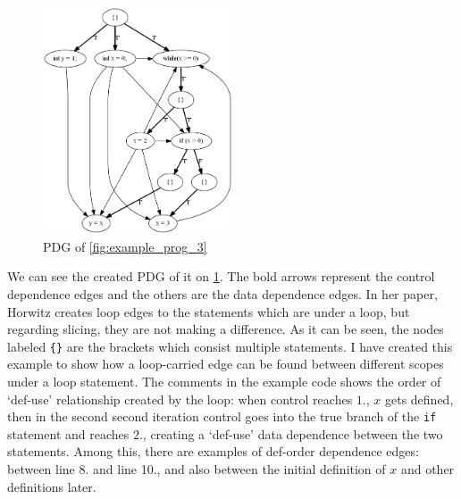 \documentclass[oneside,12pt,a4paper]{book}
\begin{document}
\begin{figure}
\includegraphics[width=0.5\textwidth]{loop_carried_test}
\caption{PDG of \ref{fig:example_prog_3}}
\label{fig:example_prog_3_PDG}
\end{figure}
We can see the created PDG of it on \ref{fig:example_prog_3_PDG}. The bold arrows represent the control dependence edges and the others are the data dependence edges. In her paper, Horwitz creates loop edges to the statements which are under a loop, but regarding slicing, they are not making a difference. As it can be seen, the nodes labeled \texttt{\{\}} are the brackets which consist multiple statements. I have created this example to show how a loop-carried edge can be found between different scopes under a loop statement. The comments in the example code shows the order of `def-use' relationship created by the loop: when control reaches $1.$, $x$ gets defined, then in the second second iteration control goes into the true branch of the \texttt{if} statement and reaches $2.$, creating a `def-use' data dependence between the two statements. Among this, there are examples of def-order dependence edges: between line 8. and line 10., and also between the initial definition of $x$ and other definitions later. %
\end{document}
